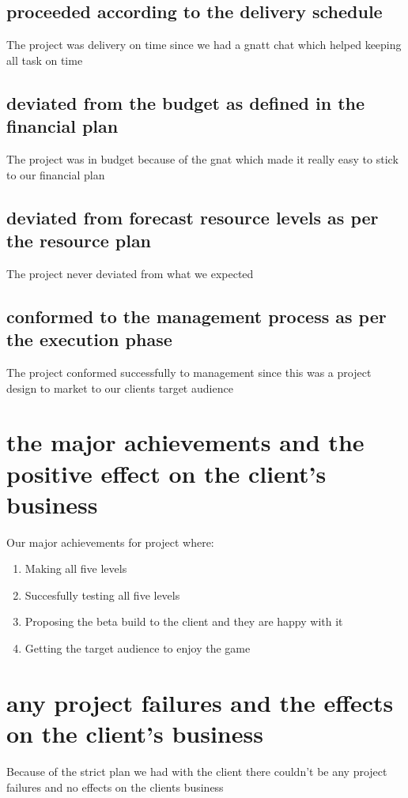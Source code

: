 \documentclass{article}
\begin{document}
	\subsection{proceeded according to the delivery schedule}
	The project was delivery on time since we had a gnatt chat which helped keeping all task on time

	\subsection{deviated from the budget as defined in the financial plan}
	The project was in budget because of the gnat which made it really easy to stick to our financial plan

	\subsection{deviated from forecast resource levels as per the resource plan}
	The project never deviated from what we expected

	\subsection{conformed to the management process as per the execution phase}
	The project conformed successfully to management since this was a project design to market to our clients target audience 

\section{the major achievements and the positive effect on the client’s business}

Our major achievements for project where:
\begin{enumerate}
	\item Making all five levels
	\item Succesfully testing all five levels
	\item Proposing the beta build to the client and they are happy with it
	\item Getting the target audience to enjoy the game
\end{enumerate}
\section{any project failures and the effects on the client’s business}
Because of the strict plan we had with the client there couldn't be any project failures and no effects on the clients business
\end{document}
